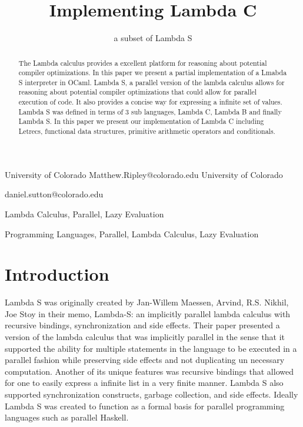 \documentclass[preprint, 10pt]{sigplanconf}
\begin{document}
\copyrightdata{[to be supplied]} 

\title{Implementing Lambda C}
\subtitle{a subset of Lambda S}

           {University of Colorado}
           {Matthew.Ripley@colorado.edu}
           {University of Colorado}
           {daniel.sutton@colorado.edu\begin{scriptsize}

\end{scriptsize}}

\maketitle

\begin{abstract}
The Lambda calculus provides a excellent platform for reasoning about potential compiler optimizations. In this paper we present a partial implementation of a Lmabda S interpreter in OCaml. Lambda S, a parallel version of the lambda calculus allows for reasoning about potential compiler optimizations that could allow for parallel execution of code. It also provides a concise way for expressing a infinite set of values. Lambda S was defined in terms of 3 sub languages, Lambda C, Lambda B and finally Lambda S. In this paper we present our implementation of Lambda C including Letrecs, functional data structures, primitive arithmetic operators and conditionals. 
\end{abstract}

\terms
Lambda Calculus, Parallel, Lazy Evaluation

\keywords
Programming Languages, Parallel, Lambda Calculus, Lazy Evaluation

\section{Introduction}
Lambda S was originally created by Jan-Willem Maessen, Arvind, R.S. Nikhil, Joe Stoy in their memo, Lambda-S: an implicitly parallel lambda calculus with recursive bindings, synchronization and side effects. Their paper presented a version of the lambda calculus that was implicitly parallel in the sense that it supported the ability for multiple statements in the language to be executed in a parallel fashion while preserving side effects and not duplicating un necessary computation. Another of its unique features was recursive bindings that allowed for one to easily express a infinite list in a very finite manner.  Lambda S also supported synchronization constructs, garbage collection, and side effects. Ideally Lambda S was created to function as a formal basis for parallel programming languages such as parallel Haskell. \citep{lambdas} 
\end{document}
